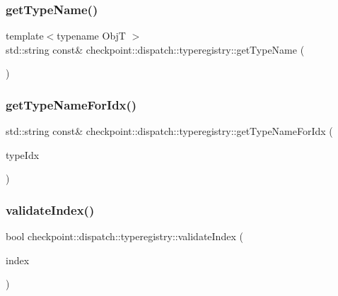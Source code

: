\subsubsection{\texorpdfstring{get\+Type\+Name()}{getTypeName()}}
{\footnotesize\ttfamily template$<$typename ObjT $>$ \\
std\+::string const\& checkpoint\+::dispatch\+::typeregistry\+::get\+Type\+Name (\begin{DoxyParamCaption}{ }\end{DoxyParamCaption})\hspace{0.3cm}{\ttfamily [inline]}}

\mbox{\label{namespacecheckpoint_1_1dispatch_1_1typeregistry_a21d113cb606378f33d1197c34ec7b123}} 
\subsubsection{\texorpdfstring{get\+Type\+Name\+For\+Idx()}{getTypeNameForIdx()}}
{\footnotesize\ttfamily std\+::string const\& checkpoint\+::dispatch\+::typeregistry\+::get\+Type\+Name\+For\+Idx (\begin{DoxyParamCaption}\item[{\hyperlink{namespacecheckpoint_1_1dispatch_1_1typeregistry_a3d1f57de0a997a245eb9e1db07b94140}{Decoded\+Index} const}]{type\+Idx }\end{DoxyParamCaption})\hspace{0.3cm}{\ttfamily [inline]}}

\mbox{\label{namespacecheckpoint_1_1dispatch_1_1typeregistry_ad6c54e529f67d0cb0aca100f1595d002}} 
\subsubsection{\texorpdfstring{validate\+Index()}{validateIndex()}}
{\footnotesize\ttfamily bool checkpoint\+::dispatch\+::typeregistry\+::validate\+Index (\begin{DoxyParamCaption}\item[{const \hyperlink{namespacecheckpoint_1_1dispatch_1_1typeregistry_a3d1f57de0a997a245eb9e1db07b94140}{Decoded\+Index}}]{index }\end{DoxyParamCaption})\hspace{0.3cm}{\ttfamily [inline]}}

